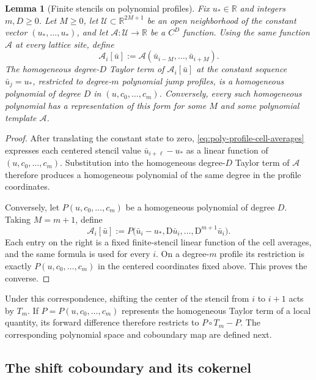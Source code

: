 \documentclass[11pt]{amsart}
\theoremstyle{plain}
\newtheorem{lemma}[theorem]{Lemma}
\theoremstyle{definition}
\theoremstyle{remark}
\numberwithin{equation}{section}
\theoremstyle{plain}
\begin{document}
\begin{lemma}[Finite stencils on polynomial profiles]
	\label{lem:finite-stencil-polynomial-profile}
	Fix $u_*\in\mathbb R$ and integers $m,D\ge0$.  Let $M\ge0$, let
	$\mathcal U\subset\mathbb R^{2M+1}$ be an open neighborhood of the
	constant vector $(u_*,\ldots,u_*)$, and let
	$\mathcal A:\mathcal U\to\mathbb R$ be a $C^D$ function.  Using the same
	function $\mathcal A$ at every lattice site, define
	\[
	\mathcal A_i[\bar u]
	:=\mathcal A(\bar u_{i-M},\ldots,\bar u_{i+M}).
	\]
	The homogeneous degree-$D$ Taylor term of $\mathcal A_i[\bar u]$ at the
	constant sequence $\bar u_j=u_*$, restricted to degree-$m$ polynomial jump
	profiles, is a homogeneous polynomial of degree $D$ in
	$(u,c_0,\ldots,c_m)$.  Conversely, every such homogeneous polynomial has a
	representation of this form for some $M$ and some polynomial template
	$\mathcal A$.
\end{lemma}

\begin{proof}
	After translating the constant state to zero,
	\eqref{eq:poly-profile-cell-averages} expresses each centered stencil value
	$\bar u_{i+\ell}-u_*$ as a linear function of $(u,c_0,\ldots,c_m)$.
	Substitution into the homogeneous degree-$D$ Taylor term of $\mathcal A$
	therefore produces a homogeneous polynomial of the same degree in the
	profile coordinates.
	
	Conversely, let $P(u,c_0,\ldots,c_m)$ be a homogeneous polynomial of degree
	$D$.  Taking $M=m+1$, define
	\[
	\mathcal A_i[\bar u]
	:=P\bigl(\bar u_i-u_*,\mathrm D\bar u_i,
	\ldots,\mathrm D^{m+1}\bar u_i\bigr).
	\]
	Each entry on the right is a fixed finite-stencil linear function of the
	cell averages, and the same formula is used for every $i$.  On a
	degree-$m$ profile its restriction is exactly $P(u,c_0,\ldots,c_m)$ in the
	centered coordinates fixed above.  This proves the converse.
\end{proof}

Under this correspondence, shifting the center of the stencil from $i$ to
$i+1$ acts by $T_m$.  If $P=P(u,c_0,\ldots,c_m)$ represents the homogeneous
Taylor term of a local quantity,
its forward difference therefore restricts to $P\circ T_m-P$.  The
corresponding polynomial space and
coboundary map are defined next.

\subsection{The shift coboundary and its cokernel}
\label{sec:shift-cokernel}
\end{document}
